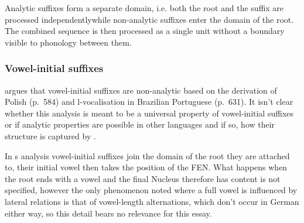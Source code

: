 Analytic suffixes form a separate domain, i.e. both the root and the
suffix are processed independently\co while non-analytic suffixes
enter the domain of the root. The combined sequence is then processed
as a single unit without a boundary visible to phonology between them.


\subsubsection{Vowel-initial suffixes}
\Cite{scheer2004} argues that vowel-initial suffixes are non-analytic
based on the derivation of Polish  (p.~584) and
l-vocalisation in Brazilian Portuguese (p.~631).
It isn't clear whether this analysis is meant to be a universal
property of vowel-initial suffixes or if analytic properties are
possible in other languages and if so, how their structure is captured
by \CVCV\footnotemark.

In \citeauthor{scheer2004}s analysis vowel-initial suffixes join the domain
of the root they are attached to,
their initial vowel then takes the position of the \gls{FEN}.
What happens when the root ends with a vowel and the final Nucleus therefore has
content is not specified, however the only phenomenon noted where a full vowel is
influenced by lateral relations is that of vowel-length alternations, which don't
occur in German either way, so this detail bears no relevance for this essay.

